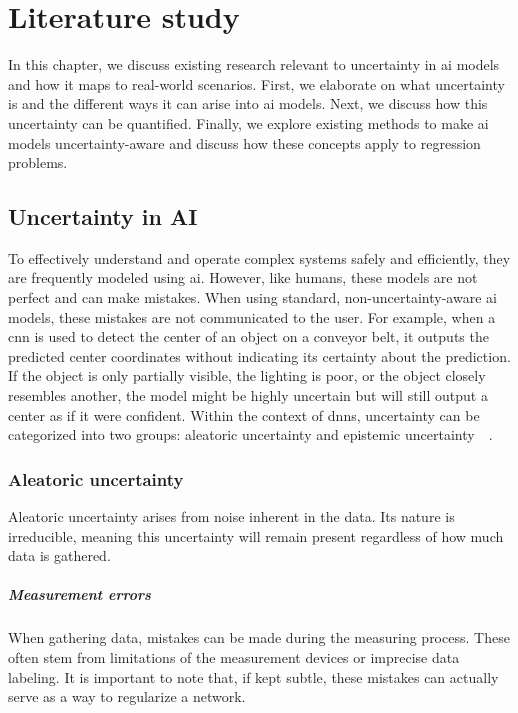 
\chapter{Literature study}\label{ch:literature-study}
In this chapter, we discuss existing research relevant to uncertainty in \gls{ai} models and how it maps to real-world scenarios.
First, we elaborate on what uncertainty is and the different ways it can arise into \gls{ai} models.
Next, we discuss how this uncertainty can be quantified.
Finally, we explore existing methods to make \gls{ai} models uncertainty-aware and discuss how these concepts apply to regression problems.

\section{Uncertainty in AI} \label{ch:literature-study_section:uncertainty-in-ai}
To effectively understand and operate complex systems safely and efficiently, they are frequently modeled using \gls{ai}.
However, like humans, these models are not perfect and can make mistakes.
When using standard, non-uncertainty-aware \gls{ai} models, these mistakes are not communicated to the user.
For example, when a \gls{cnn} is used to detect the center of an object on a conveyor belt, it outputs the predicted center coordinates without indicating its certainty about the prediction.
If the object is only partially visible, the lighting is poor, or the object closely resembles another, the model might be highly uncertain but will still output a center as if it were confident.
Within the context of \glspl{dnn}, uncertainty can be categorized into two groups: aleatoric uncertainty and epistemic uncertainty~\cite{src:survey-uncertainty-dnn}~\cite{src:scalable-bayesian-deep-learning}.

\subsection{Aleatoric uncertainty}\label{ch:literature-study_section:uncertainty-in-ai_subsection:aleatoric-uncertainty}
Aleatoric uncertainty arises from noise inherent in the data.
Its nature is irreducible, meaning this uncertainty will remain present regardless of how much data is gathered.

\paragraph{Measurement errors}\label{ch:literature-study_section:uncertainty-in-ai_paragraph:measurement-errors}
When gathering data, mistakes can be made during the measuring process.
These often stem from limitations of the measurement devices or imprecise data labeling.
It is important to note that, if kept subtle, these mistakes can actually serve as a way to regularize a network.

